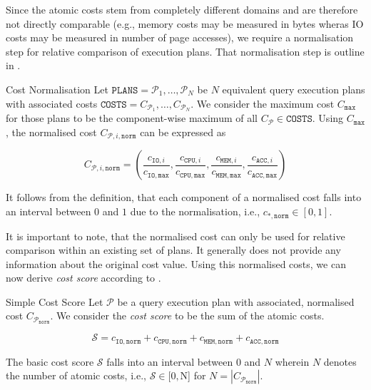 Since the atomic costs stem from completely different domains and are therefore not directly comparable (e.g., memory costs may be measured in bytes wheras IO costs may be measured in number of page accesses), we require a normalisation step for relative comparison of execution plans. That normalisation step is outline in .

\begin{definition}[label=definition:cost_normalisation]{Cost Normalisation}{}
    Let $\mathtt{PLANS} = \mathcal{P}_1, \ldots, \mathcal{P}_N$ be $N$ equivalent query execution plans with associated costs $\mathtt{COSTS} =C_{\mathcal{P}_1}, \ldots,C_{\mathcal{P}_N}$. We consider the maximum cost $C_{\mathtt{max}}$ for those plans to be the component-wise maximum of all $C_{\mathcal{P}} \in \mathtt{COSTS}$. Using $C_{\mathtt{max}}$, the normalised cost $ C_{\mathcal{P},i,\mathtt{norm}}$ can be expressed as

    \begin{equation*}
        C_{\mathcal{P},i,\mathtt{norm}} = (\frac{c_{\mathtt{IO},i}}{c_{\mathtt{IO},\mathtt{max}}},\frac{c_{\mathtt{CPU},i}}{c_{\mathtt{CPU},\mathtt{max}}},\frac{c_{\mathtt{MEM},i}}{c_{\mathtt{MEM},\mathtt{max}}},\frac{c_{\mathtt{ACC},i}}{c_{\mathtt{ACC},\mathtt{max}}})
    \end{equation*}

    It follows from the definition, that each component of a normalised cost falls into an interval between $0$ and $1$ due to the normalisation, i.e., $c_{\mathtt{*},\mathtt{norm}} \in [ 0, 1 ]$.
\end{definition}

It is important to note, that the normalised cost can only be used for relative comparison within an existing set of plans. It generally does not provide any information about the original cost value. Using this normalised costs, we can now derive \emph{cost score} according to .

\begin{definition}[label=definition:cost_score]{Simple Cost Score}{}
    Let $\mathcal{P}$  be a query execution plan with associated, normalised cost $C_{\mathcal{P}_{\mathtt{norm}}}$. We consider the \emph{cost score} to be the sum of the atomic costs.

    \begin{equation*}
        \mathcal{S} = c_{\mathtt{IO},\mathtt{norm}} + c_{\mathtt{CPU},\mathtt{norm}} + c_{\mathtt{MEM},\mathtt{norm}} + c_{\mathtt{ACC},\mathtt{norm}}
    \end{equation*}

    The basic cost score $ \mathcal{S}$ falls into an interval between $0$ and $N$ wherein $N$ denotes the number of atomic costs, i.e., $\mathcal{S} \in [0, $N] for $N = |C_{\mathcal{P}_{\mathtt{norm}}}|$.
\end{definition}

